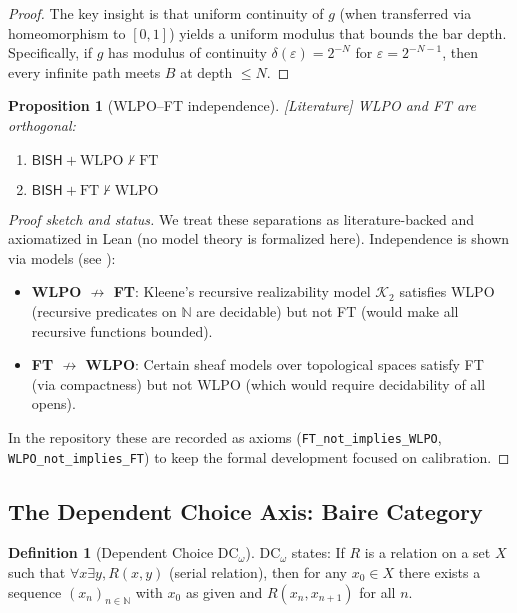 \documentclass[11pt]{article}
\theoremstyle{plain}
\newtheorem{proposition}[theorem]{Proposition}
\theoremstyle{definition}
\newtheorem{definition}[theorem]{Definition}
\newcommand{\N}{\mathbb{N}}
\newcommand{\WLPO}{\mathrm{WLPO}}
\newcommand{\FT}{\mathrm{FT}}
\newcommand{\DCw}{\mathrm{DC}_\omega}
\newcommand{\BISH}{\mathsf{BISH}}
\newcommand{\leancited}{\textsf{\textcolor{blue!70!black}{[Literature]}}}
\begin{document}
\begin{proof}
The key insight is that uniform continuity of $g$ (when transferred via homeomorphism to $[0,1]$) yields a uniform modulus that bounds the bar depth. Specifically, if $g$ has modulus of continuity $\delta(\varepsilon) = 2^{-N}$ for $\varepsilon = 2^{-N-1}$, then every infinite path meets $B$ at depth $\leq N$.
\end{proof}

\begin{proposition}[WLPO–FT independence]\label{prop:orthogonal} \leancited
WLPO and FT are orthogonal:
\begin{enumerate}
\item $\BISH + \WLPO \not\vdash \FT$
\item $\BISH + \FT \not\vdash \WLPO$
\end{enumerate}
\end{proposition}

\begin{proof}[Proof sketch and status]
We treat these separations as literature-backed and axiomatized in Lean (no model theory is formalized here).
Independence is shown via models (see \cite{vanDalen1997, Beeson1985}):
\begin{itemize}
\item \textbf{WLPO $\not\rightarrow$ FT}: Kleene's recursive realizability model $\mathcal{K}_2$ satisfies WLPO (recursive predicates on $\N$ are decidable) but not FT (would make all recursive functions bounded).
\item \textbf{FT $\not\rightarrow$ WLPO}: Certain sheaf models over topological spaces satisfy FT (via compactness) but not WLPO (which would require decidability of all opens).
\end{itemize}
In the repository these are recorded as axioms (\texttt{FT\_not\_implies\_WLPO}, \texttt{WLPO\_not\_implies\_FT}) to keep the formal development focused on calibration.
\end{proof}

\subsection{The Dependent Choice Axis: Baire Category}

\begin{definition}[Dependent Choice $\DCw$]\label{def:dcw}
$\DCw$ states: If $R$ is a relation on a set $X$ such that $\forall x \exists y, R(x,y)$ (serial relation), then for any $x_0 \in X$ there exists a sequence $(x_n)_{n \in \N}$ with $x_0$ as given and $R(x_n, x_{n+1})$ for all $n$.
\end{definition}
\end{document}
